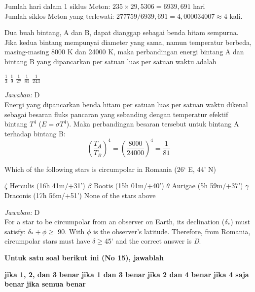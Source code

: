\documentclass[11pt,fleqn]{exam}
\begin{document}
\begin{questions}
Jumlah hari dalam 1 siklus Meton: $235\times 29,5306=6939,691$ hari\\
Jumlah siklos Meton yang terlewati: $277759/6939,691=4,000034007\approx4$ kali.


\question Dua buah bintang, A dan B, dapat dianggap sebagai benda hitam sempurna. Jika kedua bintang mempunyai diameter yang sama, namun temperatur berbeda, masing-masing 8000 K dan 24000 K, maka perbandingan energi bintang A dan bintang B yang dipancarkan per satuan luas per satuan waktu adalah
\begin{choices}
\choice $\frac{1}{3}$
\choice $\frac{1}{9}$
\choice $\frac{1}{27}$
\choice $\frac{1}{81}$
\choice $\frac{1}{243}$
\end{choices}

\textit{Jawaban:} D\\
Energi yang dipancarkan benda hitam per satuan luas per satuan waktu dikenal sebagai besaran fluks pancaran yang sebanding dengan temperatur efektif bintang $T^4$ ($E = \sigma T^4$). Maka perbandingan besaran tersebut untuk bintang A terhadap bintang B: 
$$\left( \frac{T_A}{T_B}\right)^4=\left( \frac{8000}{24000}\right)^4=\frac{1}{81}$$ 




\question Which of the following stars is circumpolar in Romania (26` E, 44' N)
\begin{choices}
\choice $\zeta$ Herculis (16h 41m/+31')
\choice $\beta$ Bootis (15h 01m/+40')
\choice $\theta$ Aurigae (5h 59m/+37')
\choice $\gamma$ Draconis (17h 56m/+51')
\choice None of the stars above
\end{choices}

\textit{Jawaban: } D\\
For a star to be circumpolar from an observer on Earth, its declination ($\delta_*$) must satisfy: $\delta_*+\phi\geq $ 90\degree. With $\phi$ is the observer's latitude. Therefore, from Romania, circumpolar stars must have $\delta\geq $45' and the correct answer is \textit{D}.




\vspace{0.5cm}
\textbf{Untuk satu soal berikut ini (No 15), jawablah}
\begin{choices}
\choice \textbf{jika 1, 2, dan 3 benar}
\choice \textbf{jika 1 dan 3 benar}
\choice \textbf{jika 2 dan 4 benar}
\choice \textbf{jika 4 saja benar}
\choice \textbf{jika semua benar}
\end{choices}


\end{questions}
\end{document}
